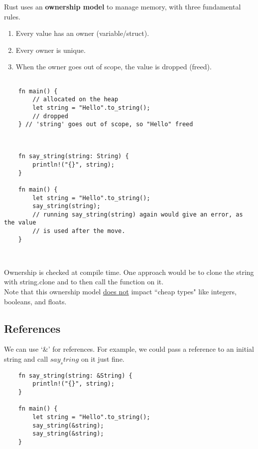 \begin{definition}
    Rust uses an \textbf{ownership model} to manage memory, with three fundamental rules.
    \begin{enumerate}
    \item Every value has an owner (variable/struct).
    \item Every owner is unique.
    \item When the owner goes out of scope, the value is dropped (freed).
    \end{enumerate}
    \end{definition}
    
    \begin{lstlisting}
    
    fn main() {
        // allocated on the heap
        let string = "Hello".to_string();
        // dropped
    } // 'string' goes out of scope, so "Hello" freed
    
    
    \end{lstlisting}
    
    
    \begin{lstlisting}
    fn say_string(string: String) {
        println!("{}", string);
    }
    
    fn main() {
        let string = "Hello".to_string();
        say_string(string);
        // running say_string(string) again would give an error, as the value
        // is used after the move.
    } 
    
    
    \end{lstlisting}
    
    Ownership is checked at compile time. One approach would be to clone the string with string.clone and to then call the function on it. \\
    
    Note that this ownership model \underline{does not} impact ``cheap types" like integers, booleans, and floats.
    
    \subsection{References}
    We can use `\&' for references. For example, we could pass a reference to an initial string and call $say_string$ on it just fine.
    
    \begin{lstlisting}
    fn say_string(string: &String) {
        println!("{}", string);
    }
    
    fn main() {
        let string = "Hello".to_string();
        say_string(&string);
        say_string(&string);
    }
    \end{lstlisting} 
        
